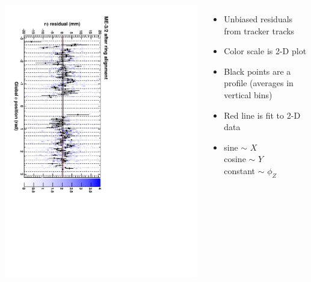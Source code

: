 \documentclass[compress]{beamer}
\begin{document}
\begin{frame}
\begin{columns}
\includegraphics[height=\linewidth, angle=90]{ringfits_after/mem32.pdf}
\begin{itemize}
\item Unbiased residuals from tracker tracks
\item Color scale is 2-D plot
\item Black points are a profile (averages in vertical bins)
\item Red line is fit to 2-D data
\item sine $\sim$ $X$ \\
cosine $\sim$ $Y$ \\
constant $\sim$ $\phi_Z$
\end{itemize}
\end{columns}
\end{frame}
\end{document}
